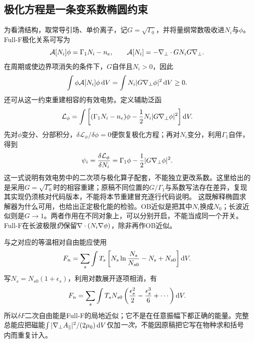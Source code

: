 \subsection{极化方程是一条变系数椭圆约束}
为看清结构，取常导引场、单价离子，记$G=\sqrt{\Gamma_0}$，并将量纲常数吸收进$N_i$与$\phi$。Full-F极化关系可写为
\begin{equation}
 \mathcal A[N_i]\phi=\Gamma_1N_i-n_e,\qquad
 \mathcal A[N_i]=-\nabla_\perp\cdot G N_i G\nabla_\perp .
\end{equation}
在周期或使边界项消失的条件下，$G$自伴且$N_i>0$，因此
\begin{equation}
 \int\phi\mathcal A[N_i]\phi\,\mathrm d V
 =\int N_i|G\nabla_\perp\phi|^2\,\mathrm d V\ge0.
\end{equation}
还可从这一约束重建相容的有效电势。定义辅助泛函
\begin{equation}
 \mathcal L_\phi=\int\left[(\Gamma_1N_i-n_e)\phi
             -{1\over2}N_i|G\nabla_\perp\phi|^2\right]\mathrm d V.
\end{equation}
先对$\phi$变分、分部积分，$\delta\mathcal L_\phi/\delta\phi=0$便恢复极化方程；再对$N_i$变分，利用$\Gamma_1$自伴，得到
\begin{equation}
 \psi_i={\delta\mathcal L_\phi\over\delta N_i}
       =\Gamma_1\phi-{1\over2}|G\nabla_\perp\phi|^2.
\end{equation}
这一式说明有效电势中的二次项与极化算子配套，不能独立更改系数。这里给出的是采用$G=\sqrt{\Gamma_0}$时的相容重建；原稿不同位置的$G/\Gamma_1$与系数写法存在差异，复现其实现仍须核对代码版本，不能将本节重建冒充逐行代码说明。
这既解释椭圆求解器为什么可用，也给出正定极化能的检验。OB近似是把其中$N_i$换成$N_0$；长波近似则是$G\to1$。两者作用在不同对象上，可以分别开启，不能当成同一个开关。Full-F在长波极限\emph{仍}保留$\nabla\cdot(N_i\nabla\phi)$，除非再作OB近似。

与之对应的等温相对自由能应使用
\begin{equation}
 F_n=\sum_s\int T_s\left[N_s\ln{N_s\over N_{s0}}-N_s+N_{s0}\right]\mathrm d V.
\end{equation}
写$N_s=N_{s0}(1+\epsilon_s)$，利用对数展开逐项相消，有
\begin{equation}
 F_n=\sum_s\int T_sN_{s0}
 \left({\epsilon_s^2\over2}-{\epsilon_s^3\over6}+\cdots\right)\mathrm d V.
\end{equation}
所以$\delta F$二次自由能是Full-F的局地近似；它不是在任意振幅下都正确的能量。完整总能应把磁能$\int|\nabla_\perp A_\parallel|^2/(2\mu_0)\,\mathrm d V$仅加\emph{一次}，不能因原稿把它写在物种求和括号内而重复计入。

